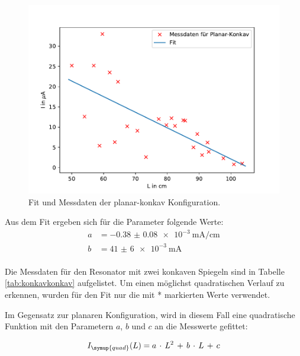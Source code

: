 \begin{figure}[H]
  \centering
  \includegraphics{stabilitaet_planarkonkav.pdf}
  \caption{Fit und Messdaten der planar-konkav Konfiguration.}
  \label{fig:planarkonkav}
\end{figure}

Aus dem Fit ergeben sich für die Parameter folgende Werte:
\begin{align}
  a &= \SI{-0.38(8)e-3}{\milli\ampere\per\centi\meter}\\
  b &= \SI{41(6)e-3}{\milli\ampere}\\
\end{align}

Die Messdaten für den Resonator mit zwei konkaven Spiegeln sind in Tabelle \ref{tab:konkavkonkav}
aufgelistet. Um einen möglichst quadratischen Verlauf zu erkennen, wurden für den Fit
nur die mit * markierten Werte verwendet.

Im Gegensatz zur planaren Konfiguration, wird in diesem Fall eine quadratische Funktion mit den
Parametern $a$, $b$ und $c$ an die Messwerte gefittet:

\begin{align}
  I_{\symup{quad}}(L) = a\,\cdot\,L^2\,+\,b\,\cdot\,L\,+\,c
\end{align}

